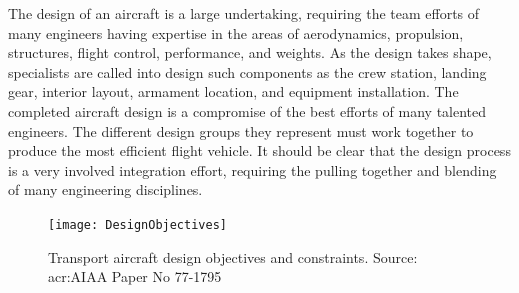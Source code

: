 \bigskip
\noindent
The design of an aircraft is a large undertaking, requiring the team efforts of many engineers having expertise in the areas of aerodynamics, propulsion, structures, flight control, performance, and weights. As the design takes shape, specialists are called into design such components as the crew station, landing gear, interior layout, armament location, and equipment installation. The completed aircraft design is a compromise of the best efforts of many talented engineers. The different design groups they represent must work together to produce the most efficient flight vehicle. It should be clear that the design process is a very involved integration effort, requiring the pulling together and blending of many engineering disciplines.\cite{nicolai2010fundamentals}
%
\begin{figure}[!t]
\centering
\texttt{[image: DesignObjectives]}
\caption{Transport aircraft design objectives and constraints. Source: \gls{acr:AIAA} Paper No 77-1795}
\label{fig:DesignObjectives}
\end{figure}

